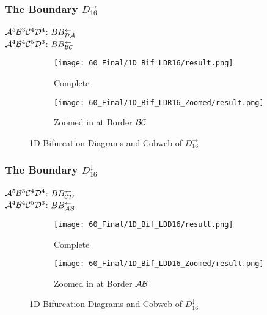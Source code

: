 \subsubsection{The Boundary $D_{16}^\rightarrow$}

$\mathcal{A}^5\mathcal{B}^3\mathcal{C}^4\mathcal{D}^4$: $BB_{\mathcal{D}\mathcal{A}}^\leftarrow$ \\
$\mathcal{A}^4\mathcal{B}^4\mathcal{C}^5\mathcal{D}^3$: $BB_{\mathcal{B}\mathcal{C}}^\leftarrow$

\begin{figure}
    \centering
    \begin{subfigure}{0.4\textwidth}
        \centering
        \texttt{[image: 60\_Final/1D\_Bif\_LDR16/result.png]}
        \caption{Complete}
        \label{fig:final.bifurcation.D.right}
    \end{subfigure}
    \begin{subfigure}{0.4\textwidth}
        \centering
        \texttt{[image: 60\_Final/1D\_Bif\_LDR16\_Zoomed/result.png]}
        \caption{Zoomed in at Border $\mathcal{B}\mathcal{C}$}
        \label{fig:final.bifurcation.D.right.zoomed}
    \end{subfigure}
    \caption{1D Bifurcation Diagrams and Cobweb of $D_{16}^\rightarrow$}
\end{figure}

\subsubsection{The Boundary $D_{16}^\downarrow$}

$\mathcal{A}^5\mathcal{B}^3\mathcal{C}^4\mathcal{D}^4$: $BB_{\mathcal{C}\mathcal{D}}^\leftarrow$ \\
$\mathcal{A}^4\mathcal{B}^4\mathcal{C}^5\mathcal{D}^3$: $BB_{\mathcal{A}\mathcal{B}}^\leftarrow$

\begin{figure}
    \centering
    \begin{subfigure}{0.4\textwidth}
        \centering
        \texttt{[image: 60\_Final/1D\_Bif\_LDD16/result.png]}
        \caption{Complete}
        \label{fig:final.bifurcation.D.down}
    \end{subfigure}
    \begin{subfigure}{0.4\textwidth}
        \centering
        \texttt{[image: 60\_Final/1D\_Bif\_LDD16\_Zoomed/result.png]}
        \caption{Zoomed in at Border $\mathcal{A}\mathcal{B}$}
        \label{fig:final.bifurcation.D.down.zoomed}
    \end{subfigure}
    \caption{1D Bifurcation Diagrams and Cobweb of $D_{16}^\downarrow$}
\end{figure}

